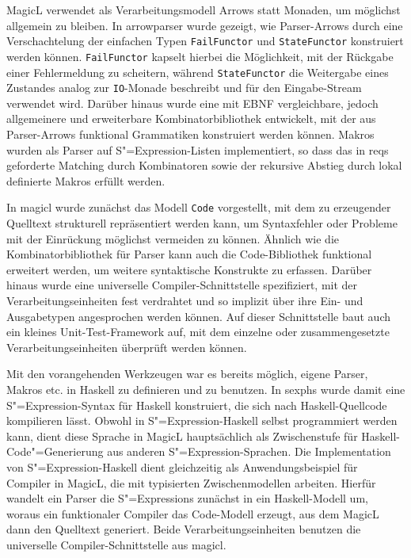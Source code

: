 \documentclass[11pt, a4paper, bibgerm]{scrbook}
\newcommand\icode[1]{\lstinline?#1?}
\newcommand\cref{}
\newcommand{\sexp}{S"=Expression}
\newcommand{\sexps}{S"=Expressions}
\newcommand{\cgen}{Code"=Generierung}
\begin{document}
MagicL verwendet als Verarbeitungsmodell Arrows statt Monaden, um
möglichst allgemein zu bleiben. In \cref{arrowparser} wurde gezeigt, wie
Parser-Arrows durch eine Verschachtelung der einfachen Typen
\icode{FailFunctor} und \icode{StateFunctor} konstruiert werden
können. \icode{FailFunctor} kapselt hierbei die Möglichkeit, mit der
Rückgabe einer Fehlermeldung zu scheitern, während \icode{StateFunctor}
die Weitergabe eines Zustandes analog zur \icode{IO}-Monade beschreibt
und für den Eingabe-Stream verwendet wird. Darüber hinaus wurde eine mit
EBNF vergleichbare, jedoch allgemeinere und erweiterbare
Kombinatorbibliothek entwickelt, mit der aus Parser-Arrows funktional
Grammatiken konstruiert werden können. Makros wurden als Parser auf
\sexp{}-Listen implementiert, so dass das in \cref{reqs} geforderte
Matching durch Kombinatoren sowie der rekursive Abstieg durch lokal
definierte Makros erfüllt werden.

In \cref{magicl} wurde zunächst das Modell \icode{Code} vorgestellt, mit
dem zu erzeugender Quelltext strukturell repräsentiert werden kann, um
Syntaxfehler oder Probleme mit der Einrückung möglichst vermeiden zu
können. Ähnlich wie die Kombinatorbibliothek für Parser kann auch die
Code-Bibliothek funktional erweitert werden, um weitere syntaktische
Konstrukte zu erfassen. Darüber hinaus wurde eine universelle
Compiler-Schnittstelle spezifiziert, mit der Verarbeitungseinheiten fest
verdrahtet und so implizit über ihre Ein- und Ausgabetypen angesprochen
werden können. Auf dieser Schnittstelle baut auch ein kleines
Unit-Test-Framework auf, mit dem einzelne oder zusammengesetzte
Verarbeitungseinheiten überprüft werden können.

Mit den vorangehenden Werkzeugen war es bereits möglich, eigene Parser,
Makros etc. in Haskell zu definieren und zu benutzen. In \cref{sexphs}
wurde damit eine \sexp{}-Syntax für Haskell konstruiert, die sich nach
Haskell-Quellcode kompilieren lässt. Obwohl in \sexp{}-Haskell selbst
programmiert werden kann, dient diese Sprache in MagicL hauptsächlich
als Zwischenstufe für Haskell-\cgen{} aus anderen \sexp{}-Sprachen. Die
Implementation von \sexp{}-Haskell dient gleichzeitig als
Anwendungsbeispiel für Compiler in MagicL, die mit typisierten
Zwischenmodellen arbeiten. Hierfür wandelt ein Parser die \sexps{}
zunächst in ein Haskell-Modell um, woraus ein funktionaler Compiler das
Code-Modell erzeugt, aus dem MagicL dann den Quelltext generiert. Beide
Verarbeitungseinheiten benutzen die universelle Compiler-Schnittstelle
aus \cref{magicl}.
\end{document}
